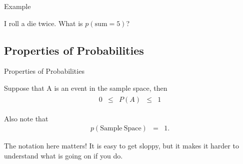 \begin{frame}{Example}

  I roll a die twice. What is $p(\mathrm{sum}=5)$?
  
\end{frame}


\subsection{Properties of Probabilities}

\begin{frame}{Properties of Probabilities}

  Suppose that A is an event in the sample space, then
  \begin{eqnarray*}
    \begin{array}{rcccl}
      0 & \leq & P(A) & \leq & 1
    \end{array}
  \end{eqnarray*}

  Also note that
  \begin{eqnarray*}
    p(\mathrm{Sample~Space}) & = & 1.
  \end{eqnarray*}

  The notation here matters! It is easy to get sloppy, but it makes it
  harder to understand what is going on if you do.
  
\end{frame}


